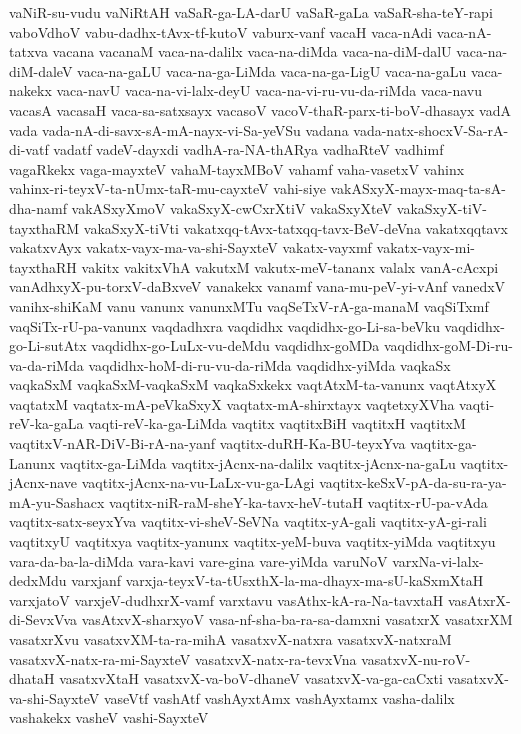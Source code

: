 {vaNiR-su-vudu
vaNiRtAH
vaSaR-ga-LA-darU
vaSaR-gaLa
vaSaR-sha-teY-rapi
vaboVdhoV
vabu-dadhx-tAvx-tf-kutoV
vaburx-vanf
vacaH
vaca-nAdi
vaca-nA-tatxva
vacana
vacanaM
vaca-na-dalilx
vaca-na-diMda
vaca-na-diM-dalU
vaca-na-diM-daleV
vaca-na-gaLU
vaca-na-ga-LiMda
vaca-na-ga-LigU
vaca-na-gaLu
vaca-nakekx
vaca-navU
vaca-na-vi-lalx-deyU
vaca-na-vi-ru-vu-da-riMda
vaca-navu
vacasA
vacasaH
vaca-sa-satxsayx
vacasoV
vacoV-thaR-parx-ti-boV-dhasayx
vadA
vada
vada-nA-di-savx-sA-mA-nayx-vi-Sa-yeVSu
vadana
vada-natx-shocxV-Sa-rA-di-vatf
vadatf
vadeV-dayxdi
vadhA-ra-NA-thARya
vadhaRteV
vadhimf
vagaRkekx
vaga-mayxteV
vahaM-tayxMBoV
vahamf
vaha-vasetxV
vahinx
vahinx-ri-teyxV-ta-nUmx-taR-mu-cayxteV
vahi-siye
vakASxyX-mayx-maq-ta-sA-dha-namf
vakASxyXmoV
vakaSxyX-cwCxrXtiV
vakaSxyXteV
vakaSxyX-tiV-tayxthaRM
vakaSxyX-tiVti
vakatxqq-tAvx-tatxqq-tavx-BeV-deVna
vakatxqqtavx
vakatxvAyx
vakatx-vayx-ma-va-shi-SayxteV
vakatx-vayxmf
vakatx-vayx-mi-tayxthaRH
vakitx
vakitxVhA
vakutxM
vakutx-meV-tananx
valalx
vanA-cAcxpi
vanAdhxyX-pu-torxV-daBxveV
vanakekx
vanamf
vana-mu-peV-yi-vAnf
vanedxV
vanihx-shiKaM
vanu
vanunx
vanunxMTu
vaqSeTxV-rA-ga-manaM
vaqSiTxmf
vaqSiTx-rU-pa-vanunx
vaqdadhxra
vaqdidhx
vaqdidhx-go-Li-sa-beVku
vaqdidhx-go-Li-sutAtx
vaqdidhx-go-LuLx-vu-deMdu
vaqdidhx-goMDa
vaqdidhx-goM-Di-ru-va-da-riMda
vaqdidhx-hoM-di-ru-vu-da-riMda
vaqdidhx-yiMda
vaqkaSx
vaqkaSxM
vaqkaSxM-vaqkaSxM
vaqkaSxkekx
vaqtAtxM-ta-vanunx
vaqtAtxyX
vaqtatxM
vaqtatx-mA-peVkaSxyX
vaqtatx-mA-shirxtayx
vaqtetxyXVha
vaqti-reV-ka-gaLa
vaqti-reV-ka-ga-LiMda
vaqtitx
vaqtitxBiH
vaqtitxH
vaqtitxM
vaqtitxV-nAR-DiV-Bi-rA-na-yanf
vaqtitx-duRH-Ka-BU-teyxYva
vaqtitx-ga-Lanunx
vaqtitx-ga-LiMda
vaqtitx-jAcnx-na-dalilx
vaqtitx-jAcnx-na-gaLu
vaqtitx-jAcnx-nave
vaqtitx-jAcnx-na-vu-LaLx-vu-ga-LAgi
vaqtitx-keSxV-pA-da-su-ra-ya-mA-yu-Sashacx
vaqtitx-niR-raM-sheY-ka-tavx-heV-tutaH
vaqtitx-rU-pa-vAda
vaqtitx-satx-seyxYva
vaqtitx-vi-sheV-SeVNa
vaqtitx-yA-gali
vaqtitx-yA-gi-rali
vaqtitxyU
vaqtitxya
vaqtitx-yanunx
vaqtitx-yeM-buva
vaqtitx-yiMda
vaqtitxyu
vara-da-ba-la-diMda
vara-kavi
vare-gina
vare-yiMda
varuNoV
varxNa-vi-lalx-dedxMdu
varxjanf
varxja-teyxV-ta-tUsxthX-la-ma-dhayx-ma-sU-kaSxmXtaH
varxjatoV
varxjeV-dudhxrX-vamf
varxtavu
vasAthx-kA-ra-Na-tavxtaH
vasAtxrX-di-SevxVva
vasAtxvX-sharxyoV
vasa-nf-sha-ba-ra-sa-damxni
vasatxrX
vasatxrXM
vasatxrXvu
vasatxvXM-ta-ra-mihA
vasatxvX-natxra
vasatxvX-natxraM
vasatxvX-natx-ra-mi-SayxteV
vasatxvX-natx-ra-tevxVna
vasatxvX-nu-roV-dhataH
vasatxvXtaH
vasatxvX-va-boV-dhaneV
vasatxvX-va-ga-caCxti
vasatxvX-va-shi-SayxteV
vaseVtf
vashAtf
vashAyxtAmx
vashAyxtamx
vasha-dalilx
vashakekx
vasheV
vashi-SayxteV
}
